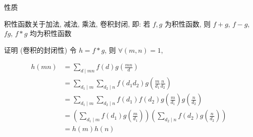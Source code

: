 \begin{frame}{性质}
	\label{mulf:prop:mulf}

	\begin{theorem}
		\label{mulf:th:prop}

		积性函数关于加法, 减法, 乘法, 卷积封闭, 即: 若 \(f,g\) 为积性函数, 则 \(f+g\), \(f-g\), \(fg\), \(f*g\) 均为积性函数
	\end{theorem}
\end{frame}


\begin{frame}{证明 (卷积的封闭性)}
	令 \(h=f*g\), 则 \(\forall (m,n)=1\),

	\[
		\begin{aligned}
			h(mn) & =\sum_{d\mid mn}f(d)g\left(\frac{mn}{d}\right)                                                                                \\
			      & =\sum_{d_1\mid m}\sum_{d_2\mid n}f(d_1d_2)g\left(\frac{m}{d_1}\frac{n}{d_2}\right)                                            \\
			      & =\sum_{d_1\mid m}\sum_{d_2\mid n}f(d_1)f(d_2)g\left(\frac{m}{d_1}\right)g\left(\frac{n}{d_2}\right)                           \\
			      & =\left(\sum_{d_1\mid m}f(d_1)g\left(\frac{m}{d_1}\right)\right)\left(\sum_{d_2\mid n}f(d_2)g\left(\frac{n}{d_2}\right)\right) \\
			      & =h(m)h(n)
		\end{aligned}
	\]
\end{frame}
